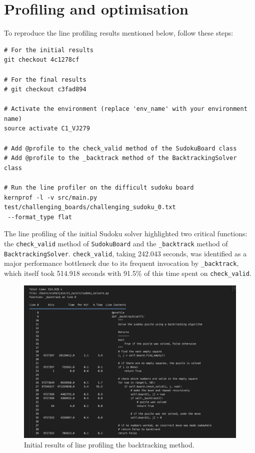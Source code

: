 \documentclass[11pt]{article}
\begin{document}
\section{Profiling and optimisation}

To reproduce the line profiling results mentioned below, follow these steps:

\begin{verbatim}
# For the initial results 
git checkout 4c1278cf

# For the final results
# git checkout c3fad894

# Activate the environment (replace 'env_name' with your environment name)
source activate C1_VJ279

# Add @profile to the check_valid method of the SudokuBoard class
# Add @profile to the _backtrack method of the BacktrackingSolver class

# Run the line profiler on the difficult sudoku board
kernprof -l -v src/main.py test/challenging_boards/challenging_sudoku_0.txt
 --format_type flat
\end{verbatim}


The line profiling of the initial Sudoku solver highlighted two critical functions: the \texttt{check\_valid} method of \texttt{SudokuBoard} and the \texttt{\_backtrack} method of \texttt{BacktrackingSolver}. \texttt{check\_valid}, taking 242.043 seconds, was identified as a major performance bottleneck due to its frequent invocation by \texttt{\_backtrack}, which itself took 514.918 seconds with 91.5\% of this time spent on \texttt{check\_valid}. 
\begin{figure}[H]
    \centering
    \includegraphics[width=1\textwidth]{figs/bt_line_profile_before.png}
    \caption{Initial results of line profiling the backtracking method.}
    \label{fig:line_profiling_bt_initial}
\end{figure}
\end{document}
